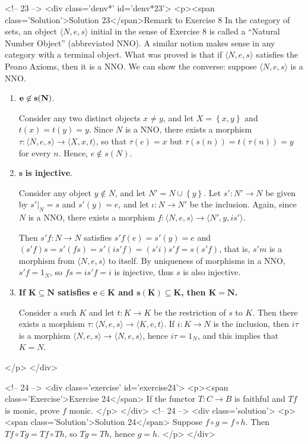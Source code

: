 <!-- 23 -->
<div class='denv*' id='denv*23'>
<p><span class='Solution'>Solution 23</span>{Remark to Exercise 8}
In the category of sets, an object $\langle N,e,s\rangle$ initial in the sense of Exercise 8 is called a ``Natural Number Object'' (abbreviated NNO). A similar notion makes sense in any category with a terminal object. What was proved is that if $\langle N,e,s\rangle$ satisfies the Peano Axioms, then it is a NNO. We can show the converse: suppose $\langle N,e,s\rangle$ is a NNO.
\begin{enumerate}
\item[\textbf{P1:}] $\bf e\not\in s(N)$.

	Consider any two distinct objects $x\neq y$, and let $X=\left\{x,y\right\}$ and $t(x)=t(y)=y$. Since $N$ is a NNO, there exists a morphism $\tau:\langle N,e,s\rangle\to\langle X,x,t\rangle$, so that $\tau(e)=x$ but $\tau(s(n))=t(\tau(n))=y$ for every $n$. Hence, $e\not\in s(N)$.
\item[\textbf{P2:}] $\mathbf{s}$\textbf{ is injective}.

	Consider any object $y\not \in N$, and let $N'=N\cup\left\{y\right\}$. Let $s':N'\to N$ be given by $s'|_N=s$ and $s'(y)=e$, and let $\iota\colon N\to N'$ be the inclusion. Again, since $N$ is a NNO, there exists a morphism $f:\langle N,e,s\rangle\to\langle N',y,is'\rangle$.

	Then $s'f:N\to N$ satisfies $s'f(e)=s'(y)=e$ and $(s'f)s=s'(fs)=s'(is'f)=(s'i)s'f=s(s'f)$, that is, $s'm$ is a morphism from $\langle N,e,s\rangle$ to itself. By uniqueness of morphisms in a NNO, $s'f=1_N$, so $fs=is'f=i$ is injective, thus $s$ is also injective.
\item[\textbf{P3:}] \textbf{If $\mathbf{K\subseteq N}$ satisfies $\mathbf{e\in K}$ and $\mathbf{s(K)\subseteq K}$, then $\mathbf{K=N}$.}

	Consider a such $K$ and let $t:K\to K$ be the restriction of $s$ to $K$. Then there exists a morphism $\tau:\langle N,e,s\rangle\to\langle K,e,t\rangle$. If $i:K\to N$ is the inclusion, then $i\tau$ is a morphism $\langle N,e,s\rangle\to\langle N,e,s\rangle$, hence $i\tau=1_N$, and this implies that $K=N$.
\end{enumerate}
</p>
</div>

<!-- 24 -->
<div class='exercise' id='exercise24'>
<p><span class='Exercise'>Exercise 24</span>
If the functor $T:C\to B$ is faithful and $Tf$ is monic, prove $f$ monic.
</p>
</div>
<!-- 24 -->
<div class='solution'>
<p><span class='Solution'>Solution 24</span>
Suppose $f\circ g=f\circ h$. Then $Tf\circ Tg=Tf\circ Th$, so $Tg=Th$, hence $g=h$.
</p>
</div>

